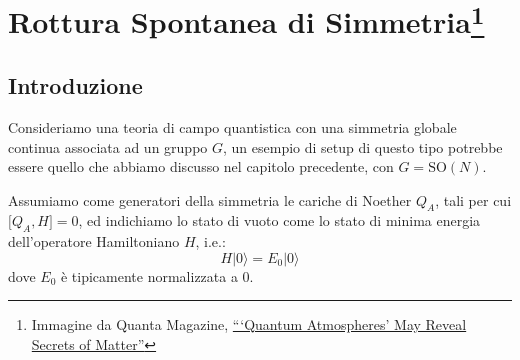 \documentclass[../main.tex]{subfiles}
\begin{document}
\setchapterpreamble[u]{\margintoc}
\chapter[Rottura Spontanea di Simmetria]{Rottura Spontanea di Simmetria\footnote{Immagine da Quanta Magazine, \href{https://www.quantamagazine.org/quantum-atmospheres-may-reveal-secrets-of-matter-20180925/}{“‘Quantum Atmospheres’ May Reveal Secrets of Matter”}}}
% 
\label{ch:SSB}
\fboxsep =1pt %



\section{Introduzione}
Consideriamo una teoria di campo quantistica con una simmetria globale continua associata ad un gruppo $G$, un esempio di setup di questo tipo potrebbe essere quello che abbiamo discusso nel capitolo precedente, con $G=\textrm{SO}(N)$.

Assumiamo come generatori della simmetria le cariche di Noether $Q_A$, tali per cui $\big[Q_A, H\big] = 0$, ed indichiamo lo stato di vuoto come lo stato di minima energia dell'operatore Hamiltoniano $H$, i.e.:
\[
H|0\rangle = E_0|0\rangle
\]
dove $E_0$ è tipicamente normalizzata a 0.
\end{document}
